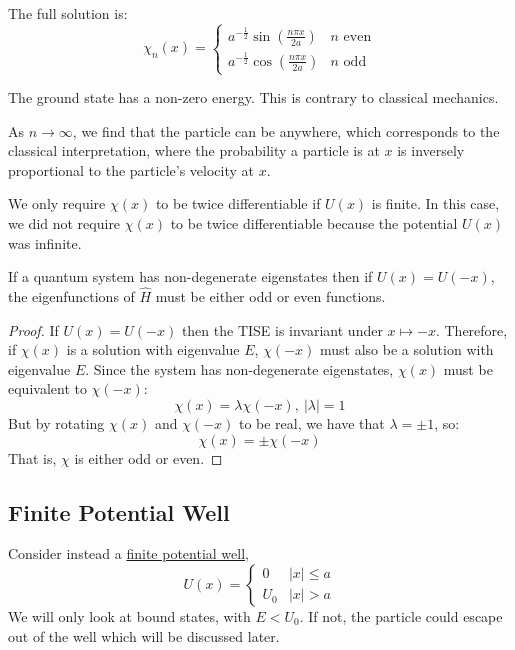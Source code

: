 \documentclass[../Main.tex]{subfiles}
\begin{document}
The full solution is:
\begin{equation*}
    \chi_n(x) =
    \begin{cases}
        a^{-\frac12} \sin(\frac{n\pi x}{2a}) & n \text{ even} \\
        a^{-\frac12} \cos(\frac{n\pi x}{2a}) & n \text{ odd}
    \end{cases}
\end{equation*}
\begin{remarks}
    \item The ground state has a non-zero energy. This is contrary to classical mechanics.
    \item As $n \to \infty$, we find that the particle can be anywhere, which corresponds to the classical interpretation, where the probability a particle is at $x$ is inversely proportional to the particle's velocity at $x$.
    \item We only require $\chi(x)$ to be twice differentiable if $U(x)$ is finite. In this case, we did not require $\chi(x)$ to be twice differentiable because the potential $U(x)$ was infinite.
\end{remarks}
\begin{proposition}
    If a quantum system has non-degenerate eigenstates then if $U(x) = U(-x)$, the eigenfunctions of $\hat{H}$ must be either odd or even functions.
    \label{propOddEvenStates}
\end{proposition}
\begin{proof}
    If $U(x) = U(-x)$ then the TISE is invariant under $x \mapsto -x$. Therefore, if $\chi(x)$ is a solution with eigenvalue $E$, $\chi(-x)$ must also be a solution with eigenvalue $E$. Since the system has non-degenerate eigenstates, $\chi(x)$ must be equivalent to $\chi(-x)$:
    \begin{equation*}
        \chi(x) = \lambda\chi(-x),~|\lambda| = 1
    \end{equation*}
    But by rotating $\chi(x)$ and $\chi(-x)$ to be real, we have that $\lambda = \pm 1$, so:
    \begin{equation*}
        \chi(x) = \pm\chi(-x)
    \end{equation*}
    That is, $\chi$ is either odd or even.
\end{proof}
\subsection{Finite Potential Well}
Consider instead a \underline{finite potential well},
\begin{equation*}
    U(x) =
    \begin{cases}
        0 & |x| \leq a \\
        U_0 & |x| > a
    \end{cases}
\end{equation*}
We will only look at bound states, with $E < U_0$. If not, the particle could escape out of the well which will be discussed later.
\end{document}
